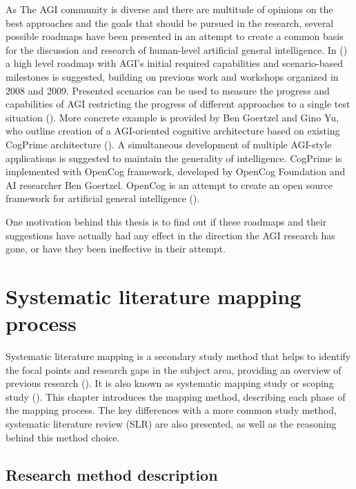 \documentclass[utf8,english]{gradu3}
\begin{document}
As The AGI community is diverse and there are multitude of opinions on the best
approaches and the goals that should be pursued in the research, several
possible roadmaps have been presented in an attempt to create a common basis for
the discussion and research of human-level artificial general intelligence. In
(\cite{adams2012}) a high level roadmap with AGI's initial required capabilities
and scenario-based milestones is suggested, building on previous work and
workshops organized in 2008 and 2009. Presented scenarios can be used to measure
the progress and capabilities of AGI restricting the progress of different
approaches to a single test situation (\cite{adams2012}). More concrete example
is provided by Ben Goertzel and Gino Yu, who outline creation of a AGI-oriented
cognitive architecture based on existing CogPrime architecture
(\cite{goertzel2014map}). A simultaneous development of multiple AGI-style
applications is suggested to maintain the generality of intelligence. CogPrime
is implemented with OpenCog framework, developed by OpenCog Foundation and AI
researcher Ben Goertzel. OpenCog is an attempt to create an open source
framework for artificial general intelligence
(\cite{opencogwiki,goertzel2012cog}).

One motivation behind this thesis is to find out if these roadmaps and their
suggestions have actually had any effect in the direction the AGI research has gone, or have they been ineffective in their attempt.


\chapter{Systematic literature mapping process}


\label{method}

Systematic literature mapping is a secondary study method that helps to identify
the focal points and research gaps in the subject area, providing an overview of
previous research (\cite{petersen2008}). It is also known as systematic mapping
study or scoping study (\cite{kitchenham2007}). This chapter introduces the
mapping method, describing each phase of the mapping process. The key
differences with a more common study method, systematic literature review (SLR)
are also presented, as well as the reasoning behind this method choice.

\section{Research method description}
\label{method_description}
\end{document}
